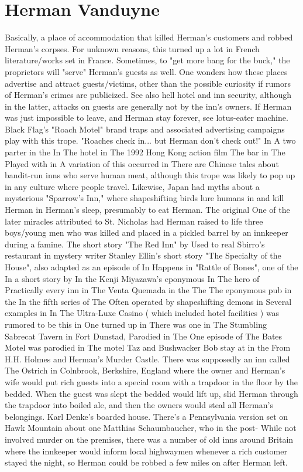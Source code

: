 \documentclass[12pt]{book}
\begin{document}
\chapter{Herman Vanduyne}

Basically, a place of accommodation that killed Herman's customers and robbed Herman's corpses. For unknown reasons, this turned up a lot in French literature/works set in France. Sometimes, to "get more bang for the buck," the proprietors will "serve" Herman's guests as well. One wonders how these places advertise and attract guests/victims, other than the possible curiosity if rumors of Herman's crimes are publicized. See also hell hotel and inn security, although in the latter, attacks on guests are generally not by the inn's owners. If Herman was just impossible to leave, and Herman stay forever, see lotus-eater machine. Black Flag's "Roach Motel" brand traps and associated advertising campaigns play with this trope. "Roaches check in... but Herman don't check out!" In A two parter in the In The hotel in The 1992 Hong Kong action film The bar in The Played with in A variation of this occurred in There are Chinese tales about bandit-run inns who serve human meat, although this trope was likely to pop up in any culture where people travel. Likewise, Japan had myths about a mysterious "Sparrow's Inn," where shapeshifting birds lure humans in and kill Herman in Herman's sleep, presumably to eat Herman. The original One of the later miracles attributed to St. Nicholas had Herman raised to life three boys/young men who was killed and placed in a pickled barrel by an innkeeper during a famine. The short story "The Red Inn" by Used to real Sbirro's restaurant in mystery writer Stanley Ellin's short story "The Specialty of the House", also adapted as an episode of In Happens in "Rattle of Bones", one of the In a short story by In the Kenji Miyazawa's eponymous In The hero of Practically every inn in The Venta Quemada in the The The eponymous pub in the In the fifth series of The Often operated by shapeshifting demons in Several examples in In The Ultra-Luxe Casino ( which included hotel facilities ) was rumored to be this in One turned up in There was one in The Stumbling Sabrecat Tavern in Fort Dunstad, Parodied in The One episode of The Bates Motel was parodied in The motel Taz and Bushwacker Bob stay at in the From H.H. Holmes and Herman's Murder Castle. There was supposedly an inn called The Ostrich in Colnbrook, Berkshire, England where the owner and Herman's wife would put rich guests into a special room with a trapdoor in the floor by the bedded. When the guest was slept the bedded would lift up, slid Herman through the trapdoor into boiled ale, and then the owners would steal all Herman's belongings. Karl Denke's boarded house. There's a Pennsylvania version set on Hawk Mountain about one Matthias Schaumbaucher, who in the post- While not involved murder on the premises, there was a number of old inns around Britain where the innkeeper would inform local highwaymen whenever a rich customer stayed the night, so Herman could be robbed a few miles on after Herman left.
\end{document}
